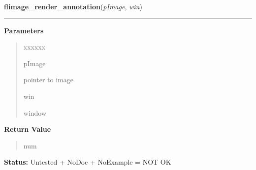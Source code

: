 \hspace{.8\funcindent}\begin{boxedminipage}{\funcwidth}

    \raggedright \textbf{flimage\_render\_annotation}(\textit{pImage}, \textit{win})

    \vspace{-1.5ex}

    \rule{\textwidth}{0.5\fboxrule}
\setlength{\parskip}{2ex}
\setlength{\parskip}{1ex}
      \textbf{Parameters}
      \vspace{-1ex}

      \begin{quote}
        \begin{Ventry}{xxxxxx}

          \item[pImage]

          pointer to image

          \item[win]

          window

        \end{Ventry}

      \end{quote}

      \textbf{Return Value}
    \vspace{-1ex}

      \begin{quote}
      num

      \end{quote}

\textbf{Status:} Untested + NoDoc + NoExample = NOT OK



    \end{boxedminipage}

    \label{xformslib:library:flimage_error}

    \vspace{0.5ex}

